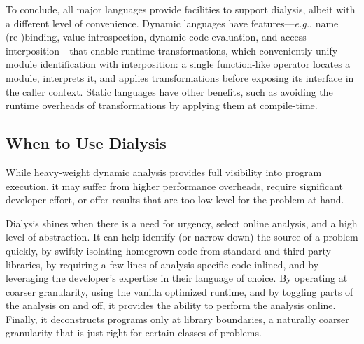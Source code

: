 \documentclass[letterpaper,twocolumn,10pt]{article}
\def\eg{{\em e.g.}, }
\begin{document}
To conclude, all major languages provide facilities to support dialysis, albeit with a different level of convenience.
Dynamic languages have features---\eg name (re-)binding, value introspection, dynamic code evaluation, and access interposition---that enable runtime transformations, which conveniently unify module identification with interposition:
  a single function-like operator locates a module, interprets it, and applies transformations before exposing its interface in the caller context.
Static languages have other benefits, such as avoiding the runtime overheads of transformations by applying them at compile-time.


\subsection{When to Use Dialysis}
\label{principles}
While heavy-weight dynamic analysis provides full visibility into program execution, it may suffer from higher performance overheads, require significant developer effort, or offer results that are too low-level for the problem at hand.

Dialysis shines when there is a need for urgency, select online analysis, and a high level of abstraction.
It can help identify (or narrow down) the source of a problem quickly, by swiftly isolating homegrown code from standard and third-party libraries, by requiring a few lines of analysis-specific code inlined, and by leveraging the developer's expertise in their language of choice.
By operating at coarser granularity, using the vanilla optimized runtime, and by toggling parts of the analysis on and off, it provides the ability to perform the analysis online.
Finally, it deconstructs programs only at library boundaries, a naturally coarser granularity that is just right for certain classes of problems.
\end{document}
